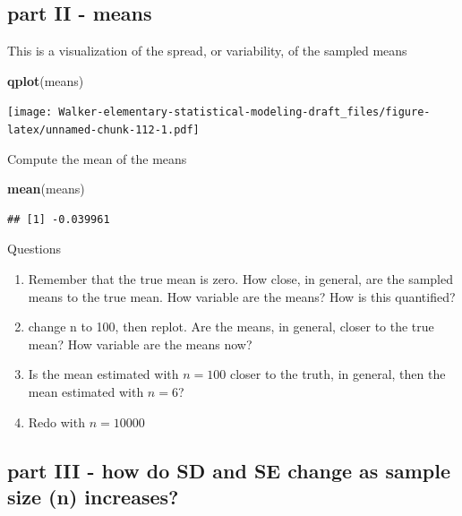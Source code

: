 \documentclass[]{book}
\newenvironment{Shaded}{\begin{snugshade}}{\end{snugshade}}
\newcommand{\KeywordTok}[1]{\textcolor[rgb]{0.13,0.29,0.53}{\textbf{#1}}}
\newcommand{\NormalTok}[1]{#1}
\providecommand{\tightlist}{%
  \setlength{\itemsep}{0pt}\setlength{\parskip}{0pt}}
\begin{document}
\hypertarget{part-ii---means}{%
\subsection{part II - means}\label{part-ii---means}}

This is a visualization of the spread, or variability, of the sampled means

\begin{Shaded}
\begin{Highlighting}[]
\KeywordTok{qplot}\NormalTok{(means)}
\end{Highlighting}
\end{Shaded}

\texttt{[image: Walker-elementary-statistical-modeling-draft\_files/figure-latex/unnamed-chunk-112-1.pdf]}

Compute the mean of the means

\begin{Shaded}
\begin{Highlighting}[]
\KeywordTok{mean}\NormalTok{(means)}
\end{Highlighting}
\end{Shaded}

\begin{verbatim}
## [1] -0.039961
\end{verbatim}

Questions

\begin{enumerate}
\def\labelenumi{\arabic{enumi}.}
\tightlist
\item
  Remember that the true mean is zero. How close, in general, are the sampled means to the true mean. How variable are the means? How is this quantified?
\item
  change n to 100, then replot. Are the means, in general, closer to the true mean? How variable are the means now?
\item
  Is the mean estimated with \(n=100\) closer to the truth, in general, then the mean estimated with \(n=6\)?
\item
  Redo with \(n=10000\)
\end{enumerate}

\hypertarget{part-iii---how-do-sd-and-se-change-as-sample-size-n-increases}{%
\subsection{part III - how do SD and SE change as sample size (n) increases?}\label{part-iii---how-do-sd-and-se-change-as-sample-size-n-increases}}
\end{document}
